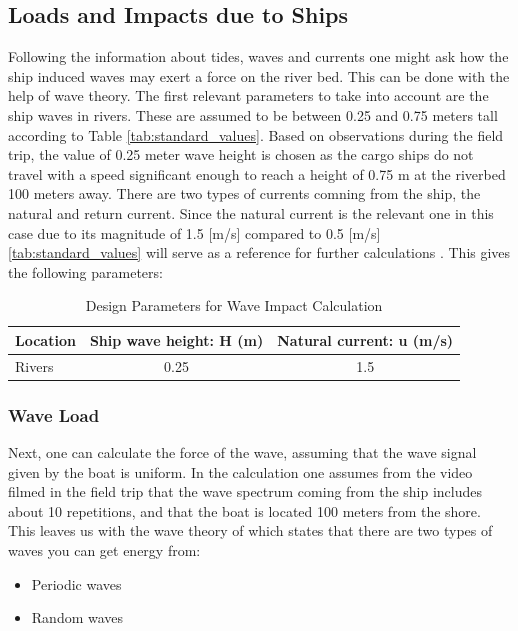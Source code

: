 \subsection{Loads and Impacts due to Ships}
Following the information about tides, waves and currents one might ask how the ship induced waves may exert a force on the river bed. This can be done with the help of wave theory. The first relevant parameters to take into account are the ship waves in rivers. These are assumed to be between 0.25 and 0.75 meters tall according to Table \ref{tab:standard_values}. Based on observations during the field trip, the value of 0.25 meter wave height is chosen as the cargo ships do not travel with a speed significant enough to reach a height of 0.75 m at the riverbed 100 meters away.
There are two types of currents comning from the ship, the natural and return current. Since the natural current is the relevant one in this case due to its magnitude of 1.5 [m/s] compared to 0.5 [m/s] \ref{tab:standard_values} will serve as a reference for further calculations \autocite{hasanShipinducedWaveForces2025}.
This gives the following parameters:

\begin{table}[H]
    \centering
    \caption{Design Parameters for Wave Impact Calculation}
    \label{tab:Parameters for Wave Impact Calculation}
    \begin{tabular}{lcc}
        \toprule
        Location & Ship wave height: H (m) & Natural current: u (m/s) \\
        \midrule
        Rivers & 0.25 & 1.5 \\
        \bottomrule
    \end{tabular}
\end{table}

\subsubsection{Wave Load}
Next, one can calculate the force of the wave, assuming that the wave signal given by the boat is uniform. In the calculation one assumes from the video filmed in the field trip that the wave spectrum coming from the ship includes about 10 repetitions, and that the boat is located 100 meters from the shore. This leaves us with the wave theory of \autocite{arrigaLecture2CIEM40002025} which states that there are two types of waves you can get energy from:

\begin{itemize}
    \item Periodic waves 
    \item Random waves 
\end{itemize}

